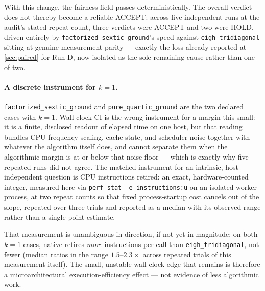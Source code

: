 \documentclass[twocolumn,10pt,a4paper]{article}
\theoremstyle{plain}
\theoremstyle{definition}
\newcommand{\ACCEPT}{\textsf{ACCEPT}}
\newcommand{\HOLD}{\textsf{HOLD}}
\begin{document}
With this change, the fairness field passes deterministically. The overall
verdict does not thereby become a reliable \ACCEPT{}: across five independent
runs at the audit's stated repeat count, three verdicts were \ACCEPT{} and two
were \HOLD{}, driven entirely by \texttt{factorized\_sextic\_ground}'s speed
against \texttt{eigh\_tridiagonal} sitting at genuine measurement parity ---
exactly the loss already reported at \cref{sec:paired} for Run D, now isolated
as the sole remaining cause rather than one of two.

\paragraph{A discrete instrument for $k=1$.}
\texttt{factorized\_sextic\_ground} and \texttt{pure\_quartic\_ground} are the
two declared cases with $k=1$. Wall-clock CI is the wrong instrument for a
margin this small: it is a finite, disclosed readout of elapsed time on one
host, but that reading bundles CPU frequency scaling, cache state, and
scheduler noise together with whatever the algorithm itself does, and cannot
separate them when the algorithmic margin is at or below that noise floor
--- which is exactly why five repeated runs did not agree. The matched
instrument for an intrinsic, host-independent question is CPU instructions
retired: an exact, hardware-counted integer, measured here via
\texttt{perf stat -e instructions:u} on an isolated worker process, at two
repeat counts so that fixed process-startup cost cancels out of the slope,
repeated over three trials and reported as a median with its observed range
rather than a single point estimate.

That measurement is unambiguous in direction, if not yet in magnitude: on
both $k=1$ cases, native retires \emph{more} instructions per call than
\texttt{eigh\_tridiagonal}, not fewer (median ratios in the range
$1.5$--$2.3\times$ across repeated trials of this measurement itself). The
small, unstable wall-clock edge that remains is therefore a
microarchitectural execution-efficiency effect --- not evidence of less
algorithmic work.
\end{document}
